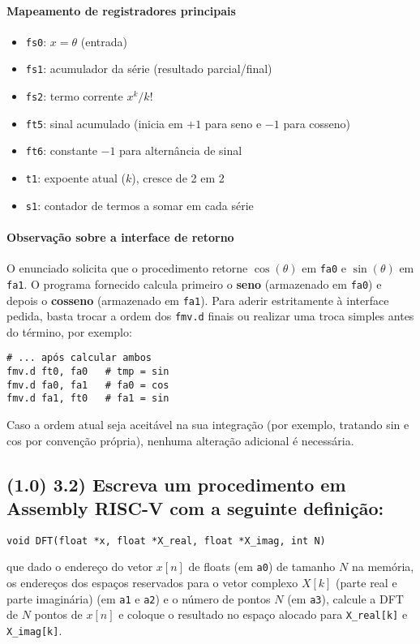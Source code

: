\documentclass[12pt,a4paper]{article}
\begin{document}
\paragraph{Mapeamento de registradores principais}
\begin{itemize}
    \item \texttt{fs0}: \(x=\theta\) (entrada)
    \item \texttt{fs1}: acumulador da série (resultado parcial/final)
    \item \texttt{fs2}: termo corrente \(x^{k}/k!\)
    \item \texttt{ft5}: sinal acumulado (inicia em $+1$ para seno e $-1$ para cosseno)
    \item \texttt{ft6}: constante $-1$ para alternância de sinal
    \item \texttt{t1}: expoente atual (\(k\)), cresce de 2 em 2
    \item \texttt{s1}: contador de termos a somar em cada série
\end{itemize}

\paragraph{Observação sobre a interface de retorno}
O enunciado solicita que o procedimento retorne $\cos(\theta)$ em \texttt{fa0} e $\sin(\theta)$ em \texttt{fa1}. O programa fornecido calcula primeiro o \textbf{seno} (armazenado em \texttt{fa0}) e depois o \textbf{cosseno} (armazenado em \texttt{fa1}). Para aderir estritamente à interface pedida, basta trocar a ordem dos \texttt{fmv.d} finais ou realizar uma troca simples antes do término, por exemplo:
\begin{lstlisting}[language=Assembly]
# ... após calcular ambos
fmv.d ft0, fa0   # tmp = sin
fmv.d fa0, fa1   # fa0 = cos
fmv.d fa1, ft0   # fa1 = sin
\end{lstlisting}
Caso a ordem atual seja aceitável na sua integração (por exemplo, tratando sin e cos por convenção própria), nenhuma alteração adicional é necessária.

\subsection*{(1.0) 3.2) Escreva um procedimento em Assembly RISC-V com a seguinte definição:}
\begin{verbatim}
void DFT(float *x, float *X_real, float *X_imag, int N)
\end{verbatim}
que dado o endereço do vetor $x[n]$ de floats (em \texttt{a0}) de tamanho $N$ na memória, os endereços dos espaços reservados para o vetor complexo $X[k]$ (parte real e parte imaginária) (em \texttt{a1} e \texttt{a2}) e o número de pontos $N$ (em \texttt{a3}), calcule a DFT de $N$ pontos de $x[n]$ e coloque o resultado no espaço alocado para \texttt{X\_real[k]} e \texttt{X\_imag[k]}.
\end{document}
